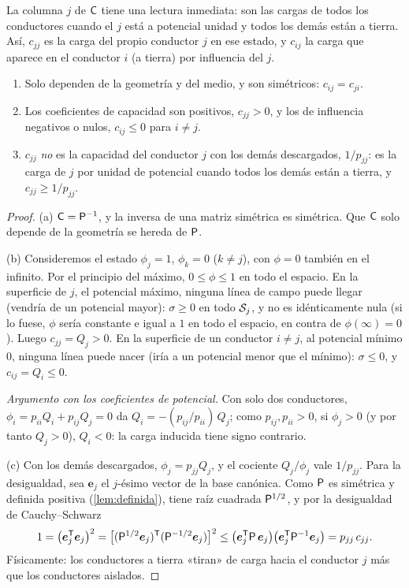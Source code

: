 La columna $j$ de $\mathsf{C}$ tiene una lectura inmediata: son las cargas de todos los conductores cuando el $j$ está a potencial unidad y todos los demás están
a tierra. Así, $c_{jj}$ es la carga del propio conductor $j$ en ese estado, y $c_{ij}$ la carga que aparece en el conductor $i$ (a tierra) por influencia
del $j$.

\begin{teorema}\label{teo:cij-prop}
\begin{enumerate}[label=\textup{(\alph*)}]
  \item Solo dependen de la geometría y del medio, y son simétricos: $c_{ij}=c_{ji}$.
  \item Los coeficientes de capacidad son positivos, $c_{jj}>0$, y los de influencia negativos o nulos, $c_{ij}\le0$ para $i\neq j$.
  \item $c_{jj}$ \emph{no} es la capacidad del conductor $j$ con los demás descargados, $1/p_{jj}$: es la carga de $j$ por unidad de potencial cuando
        todos los demás están a tierra, y $c_{jj}\ge1/p_{jj}$.
\end{enumerate}
\end{teorema}
\begin{proof}
(a) $\mathsf{C}=\mathsf{P}^{-1}$, y la inversa de una matriz simétrica es simétrica. Que $\mathsf{C}$ solo depende de la geometría se hereda de $\mathsf{P}$.

(b) Consideremos el estado $\phi_j=1$, $\phi_k=0$ ($k\neq j$), con $\phi=0$ también en el infinito. Por el principio del máximo, $0\le\phi\le1$ en todo
el espacio. En la superficie de $j$, el potencial máximo, ninguna línea de campo puede llegar (vendría de un potencial mayor): $\sigma\ge0$ en todo $\mathcal{S}_j$,
y no es idénticamente nula (si lo fuese, $\phi$ sería constante e igual a $1$ en todo el espacio, en contra de $\phi(\infty)=0$). Luego $c_{jj}=Q_j>0$.
En la superficie de un conductor $i\neq j$, al potencial mínimo $0$, ninguna línea puede nacer (iría a un potencial menor que el mínimo): $\sigma\le0$,
y $c_{ij}=Q_i\le0$.

\emph{Argumento con los coeficientes de potencial.} Con solo dos conductores, $\phi_i=p_{ii}Q_i+p_{ij}Q_j=0$ da $Q_i=-(p_{ij}/p_{ii})\,Q_j$; como
$p_{ij},p_{ii}>0$, si $\phi_j>0$ (y por tanto $Q_j>0$), $Q_i<0$: la carga inducida tiene signo contrario.

(c) Con los demás descargados, $\phi_j=p_{jj}Q_j$, y el cociente $Q_j/\phi_j$ vale $1/p_{jj}$. Para la desigualdad, sea $\bm{e}_j$ el
$j$-ésimo vector de la base canónica. Como $\mathsf{P}$ es simétrica y definida positiva (\cref{lem:definida}), tiene raíz cuadrada $\mathsf{P}^{1/2}$, y por la
desigualdad de Cauchy--Schwarz
\[
  1=\bigl(\bm{e}_j^{\mathsf{T}}\bm{e}_j\bigr)^{2}=\bigl[(\mathsf{P}^{1/2}\bm{e}_j)^{\mathsf{T}}(\mathsf{P}^{-1/2}\bm{e}_j)\bigr]^{2}
  \le\bigl(\bm{e}_j^{\mathsf{T}}\mathsf{P}\,\bm{e}_j\bigr)\bigl(\bm{e}_j^{\mathsf{T}}\mathsf{P}^{-1}\bm{e}_j\bigr)=p_{jj}\,c_{jj} .
\]
Físicamente: los conductores a tierra «tiran» de carga hacia el conductor $j$ más que los conductores aislados.
\end{proof}

